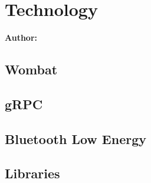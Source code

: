 \chapter{Technology}

\textbf{Author: }

\section{Wombat}

\section{gRPC}

\section{Bluetooth Low Energy}

\section{Libraries}

\filbreak
